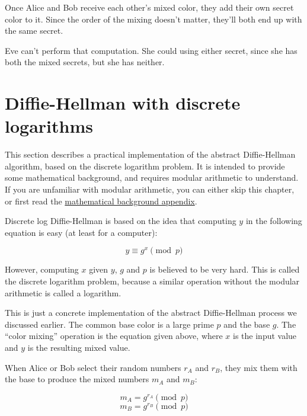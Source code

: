 \documentclass[11pt,ebook,table,dvipsnames]{memoir}
\begin{document}
Once Alice and Bob receive each other's mixed color, they add their
own secret color to it. Since the order of the mixing doesn't
matter, they'll both end up with the same secret.


Eve can't perform that computation. She could using either secret,
since she has both the mixed secrets, but she has neither.
\section{Diffie-Hellman with discrete logarithms}
\label{sec-2-4-3}

This section describes a practical implementation of the abstract
Diffie-Hellman algorithm, based on the discrete logarithm problem. It
is intended to provide some mathematical background, and requires
modular arithmetic to understand. If you are unfamiliar with modular
arithmetic, you can either skip this chapter, or first read the
\hyperref[Modular-arithmetic]{mathematical background appendix}.

Discrete log Diffie-Hellman is based on the idea that computing $y$ in
the following equation is easy (at least for a computer):

\begin{equation}
y \equiv g^x \pmod{p}
\end{equation}

However, computing $x$ given $y$, $g$ and $p$ is believed to be very
hard. This is called the discrete logarithm problem, because a similar
operation without the modular arithmetic is called a logarithm.

This is just a concrete implementation of the abstract Diffie-Hellman
process we discussed earlier. The common base color is a large prime
$p$ and the base $g$. The \enquote{color mixing} operation is the equation
given above, where $x$ is the input value and $y$ is the resulting
mixed value.

When Alice or Bob select their random numbers $r_A$ and $r_B$, they
mix them with the base to produce the mixed numbers $m_A$ and $m_B$:

\begin{equation}
m_A = g^{r_A} \pmod{p}
\end{equation}
\begin{equation}
m_B = g^{r_B} \pmod{p}
\end{equation}
\end{document}
